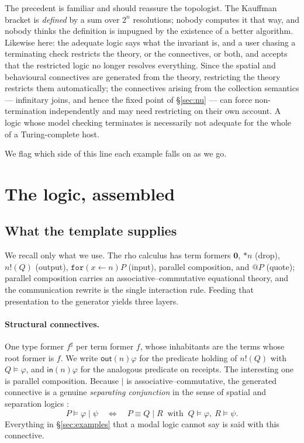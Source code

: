\documentclass[11pt]{article}
\theoremstyle{definition}
\newcommand{\Nil}{\mathbf{0}}
\newcommand{\sep}{\mathbin{\vert}}
\begin{document}
The precedent is familiar and should reassure the topologist. The Kauffman
bracket is \emph{defined} by a sum over $2^n$ resolutions; nobody computes it that
way, and nobody thinks the definition is impugned by the existence of a better
algorithm. Likewise here: the adequate logic says what the invariant is, and a
user chasing a terminating check restricts the theory, or the connectives, or
both, and accepts that the restricted logic no longer resolves everything. Since
the spatial and behavioural connectives are generated from the theory, restricting
the theory restricts them automatically; the connectives arising from the
collection semantics --- infinitary joins, and hence the fixed point of
\S\ref{sec:nu} --- can force non-termination independently and may need
restricting on their own account. A logic whose model checking terminates is
necessarily not adequate for the whole of a Turing-complete host.

We flag which side of this line each example falls on as we go.

\section{The logic, assembled}\label{sec:logic}

\subsection{What the template supplies}

We recall only what we use. The rho calculus has term formers
$\Nil$, $*n$ (drop), $n!(Q)$ (output), $\mathtt{for}(x \leftarrow n)P$ (input),
parallel composition, and $@P$ (quote); parallel composition carries an
associative--commutative equational theory, and the communication rewrite is the
single interaction rule. Feeding that presentation to the generator yields three
layers.

\paragraph{Structural connectives.}
One type former $f^\sharp$ per term former $f$, whose inhabitants are the terms
whose root former is $f$. We write $\mathsf{out}(n)\varphi$ for the predicate
holding of $n!(Q)$ with $Q \models \varphi$, and
$\mathsf{in}(n)\varphi$ for the analogous predicate on receipts. The interesting
one is parallel composition. Because $\sep$ is associative--commutative, the
generated connective is a genuine \emph{separating conjunction} in the sense of
spatial and separation logics \cite{caires-cardelli,reynolds}:
\[
P \models \varphi \sep \psi
\quad\Longleftrightarrow\quad
P \equiv Q \sep R \ \text{ with } \ Q \models \varphi,\ R \models \psi .
\]
Everything in \S\ref{sec:examples} that a modal logic cannot say is said with
this connective.
\end{document}
